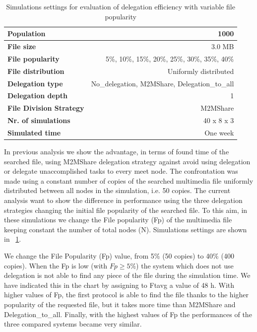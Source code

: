 \begin{table}[h]
\begin{center}
\begin{tabular}{|l|r|}
\hline
\bfseries Population & 1000 \\
\hline
\bfseries File size & 3.0 MB \\
\hline
\bfseries File popularity & 5\%, 10\%, 15\%, 20\%, 25\%, 30\%, 35\%, 40\% \\
\hline
\bfseries File distribution & Uniformly distributed \\
\hline
\bfseries Delegation type & No\_delegation, M2MShare, Delegation\_to\_all \\
\hline
\bfseries Delegation depth & 1 \\
\hline
\bfseries File Division Strategy & M2MShare \\
\hline
\bfseries Nr. of simulations & 40 x 8 x 3\\
\hline
\bfseries Simulated time & One week \\
\hline
\end{tabular}
\end{center}
\caption{Simulations settings for evaluation of delegation efficiency with variable file popularity\label{tab:settingsDiversaFilePop}}
\end{table}
In previous analysis we show the advantage, in terms of found time of the searched file, using M2MShare delegation strategy against avoid using delegation or delegate unaccomplished tasks to every meet node. The confrontation was made using a constant number of copies of the searched multimedia file uniformly distributed between all nodes in the simulation, i.e. 50 copies. The current analysis want to show the difference in performance using the three delegation strategies changing the initial file popularity of the searched file. To this aim, in these simulations we change the File popularity (Fp) of the multimedia file keeping constant the number of total nodes (N). Simulations settings are shown in \tablename~\ref{tab:settingsDiversaFilePop}.

We change the File Popularity (Fp) value, from 5\% (50 copies) to 40\% (400 copies). When the Fp is low (with $Fp \geq 5\%$) the system which does not use delegation is not able to find any piece of the file during the simulation time. We have indicated this in the chart by assigning to Ftavg a value of 48 h. With higher values of Fp, the first protocol is able to find the file thanks to the higher popularity of the requested file, but it takes more time than M2MShare and Delegation\_to\_all. Finally, with the highest values of Fp the performances of the three compared systems became very similar. 



